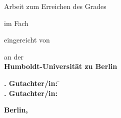 \makeatletter
\begin{titlepage}
\doublespacing\centering%
\vspace*{-24.5mm}\noindent\makebox[\textwidth]{\phantom{Vadid Gissnkra}\hspace*{-19mm}}

\textbf{\Huge\sffamily \@title}\vskip 2.5mm

\textbf{\Large\sffamily \@subtitle}\vfill

{\large Arbeit zum Erreichen des Grades}\\
\textbf{\Large\sffamily\degreevar}\vfill

{\large im Fach}\\
\resizebox{%
      \ifdim\width>\textwidth
        \textwidth
      \else
        \width
      \fi
    }{!}{%
    \textbf{\Large\sffamily\programmevar}}\vfill

{\large eingereicht von}\\
\resizebox{%
      \ifdim\width>\textwidth
        \textwidth
      \else
        \width
      \fi
    }{!}{%
    \textbf{\Large\sffamily \@author}}\vfill

{\large an der}\\
\textbf{\Large\sffamily Humboldt-Universität zu Berlin}\vfill

\resizebox{%
      \ifdim\width>\textwidth
        \textwidth
      \else
        \width
      \fi
    }{!}{%
    \textbf{\Large\sffamily\facultyvar}}

\resizebox{%
      \ifdim\width>\textwidth
        \textwidth
      \else
        \width
      \fi
    }{!}{%
    \textbf{\Large\sffamily\institutevar}}\vfill

\parbox{0cm}{\large%
    \begin{tabbing}
        \textbf{. Gutachter/in:} \= \firstsupervisorvar\\
        \textbf{. Gutachter/in:} \> \secondsupervisorvar
    \end{tabbing}
}\vfill


\enlargethispage{16mm}\textbf{\large\sffamily Berlin, \@date}
\end{titlepage}
\makeatother